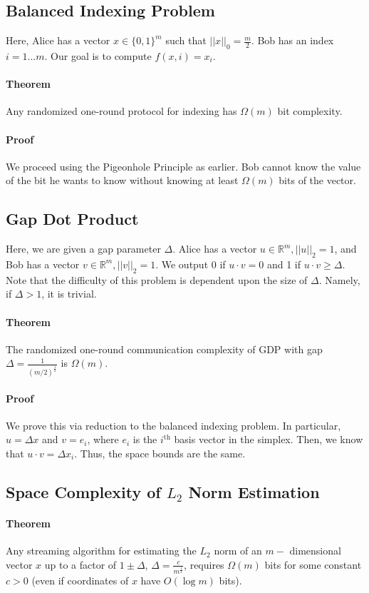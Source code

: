 \documentclass[11pt]{article}
\newcommand{\R}{\mathbb{R}}
\begin{document}
\subsection{Balanced Indexing Problem}
Here, Alice has a vector $x \in \{0,1\}^m$ such that $||x||_0 = \frac{m}{2}$. Bob has an index $i = 1 ... m$. Our goal is to compute $f(x,i) = x_i$.
\paragraph{Theorem} Any randomized one-round protocol for indexing has $\Omega(m)$ bit complexity.
\paragraph{Proof} We proceed using the Pigeonhole Principle as earlier. Bob cannot know the value of the bit he wants to know without knowing at least $\Omega(m)$ bits of the vector.

\subsection{Gap Dot Product}
Here, we are given a gap parameter $\Delta$. Alice has a vector $u \in \R^m, ||u||_2 =1$, and Bob has a vector $v \in \R^m, ||v||_2 = 1$. We output 0 if $u \cdot v = 0$ and 1 if $u \cdot v \ge \Delta$. Note that the difficulty of this problem is dependent upon the size of $\Delta$. Namely, if $\Delta > 1$, it is trivial.
\paragraph{Theorem} The randomized one-round communication complexity of GDP with gap $\Delta = \frac{1}{(m/2)^{\frac{1}{2}}}$ is $\Omega(m)$.
\paragraph{Proof} We prove this via reduction to the balanced indexing problem. In particular, $u = \Delta x$ and $v = e_i$, where $e_i$ is the $i^\text{th}$ basis vector in the simplex. Then, we know that $u \cdot v = \Delta x_i$. Thus, the space bounds are the same.
\subsection{Space Complexity of $L_2$ Norm Estimation}
\paragraph{Theorem} Any streaming algorithm for estimating the $L_2$ norm of an $m-$ dimensional vector $x$ up to a factor of $1 \pm \Delta$, $\Delta=\frac{c}{m^\frac{1}{2}}$, requires $\Omega(m)$ bits for some constant $c>0$ (even if coordinates of $x$ have $O(\log m)$ bits).
\end{document}
